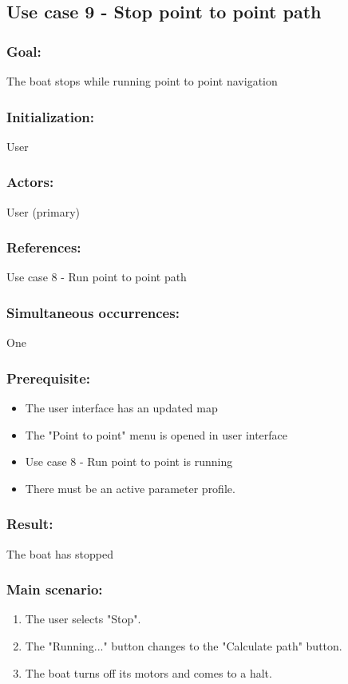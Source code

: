 \begin{framed}
	\subsection{Use case 9 - Stop point to point path}
	\subsubsection*{Goal:}
	The boat stops while running point to point navigation
	
	\subsubsection*{Initialization:}
	User
	
	\subsubsection*{Actors:}
	User (primary)
	
	\subsubsection*{References:}
	Use case 8 - Run point to point path
	
	\subsubsection*{Simultaneous occurrences:}
	One 
	
	\subsubsection*{Prerequisite:}
	\begin{itemize}
		\item The user interface has an updated map
		\item The "Point to point" menu is opened in user interface
		\item Use case 8 - Run point to point is running
		\item There must be an active parameter profile.
		
	\end{itemize}
	
	\subsubsection*{Result:}
	The boat has stopped
	
	\subsubsection*{Main scenario:}
	\begin{enumerate}
		\item The user selects "Stop".
		\item The "Running..." button changes to the "Calculate path" button.
		\item The boat turns off its motors and comes to a halt.
	\end{enumerate}	
\end{framed}	


